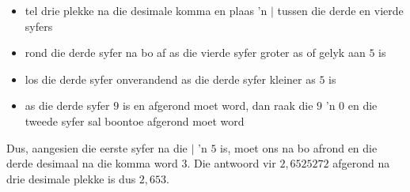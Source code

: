 \begin{itemize}
\item tel drie plekke na die desimale komma en plaas 'n $|$ tussen die derde en vierde syfers
\item rond die derde syfer na bo af as die vierde syfer groter as of gelyk aan $5$ is
\item los die derde syfer onverandend as die derde syfer kleiner as $5$ is
\item as die derde syfer $9$ is en afgerond moet word, dan raak die $9$ 'n $0$ en die tweede syfer sal boontoe afgerond moet word 
\end{itemize}
\par 
% 
% 
\par 
Dus, aangesien die eerste syfer na die $|$ 'n $5$ is, moet ons na bo afrond en die derde desimaal na die komma word $3$. Die antwoord vir $2,6525272$ afgerond na drie desimale plekke is dus $2,653$.
\par


